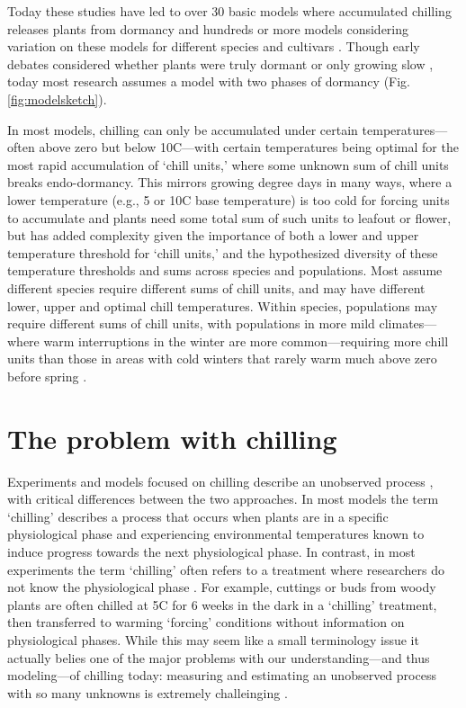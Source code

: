 \documentclass[11pt]{article}
\begin{document}
Today these studies have led to over 30 basic models where accumulated chilling releases plants from dormancy and hundreds or more models considering variation on these models for different species and cultivars \citep[][]{basler2016evaluating,hufkens2018integrated}. Though early debates considered whether plants were truly dormant or only growing slow \citep[`dormancy' or `rest' versus `quiescent;][]{considine2016language}, today most research assumes a model with two phases of dormancy (Fig. \ref{fig:modelsketch}). 

In most models, chilling can only be accumulated under certain temperatures---often above zero but below 10\degree C---with certain temperatures being optimal for the most rapid accumulation of `chill units,' where some unknown sum of chill units breaks endo-dormancy. This mirrors growing degree days in many ways, where a lower temperature (e.g., 5 or 10\degree C base temperature) is too cold for forcing units to accumulate and plants need some total sum of such units to leafout or flower, but has added complexity given the importance of both a lower and upper temperature threshold for `chill units,' and the hypothesized diversity of these temperature thresholds and sums across species and populations. Most assume different species require different sums of chill units, and may have different lower, upper and optimal chill temperatures. Within species, populations may require different sums of chill units, with populations in more mild climates---where warm interruptions in the winter are more common---requiring more chill units than those in areas with cold winters that rarely warm much above zero before spring \citep{campbell1979,leinonen1996dependence}. 

\section*{The problem with chilling} 

Experiments and models focused on chilling describe an unobserved process \citep{chuine2016}, with critical differences between the two approaches. In most models the term `chilling' describes a process that occurs when plants are in a specific physiological phase and experiencing environmental temperatures known to induce progress towards the next physiological phase. In contrast, in most experiments the term `chilling' often refers to a treatment where researchers do not know the physiological phase \citep{flynn2018,ospreebbms}. For example, cuttings or buds from woody plants are often chilled at 5\degree C for 6 weeks in the dark in a `chilling' treatment, then transferred to warming `forcing' conditions without information on physiological phases. While this may seem like a small terminology issue it actually belies one of the major problems with our understanding---and thus modeling---of chilling today: measuring and estimating an unobserved process with so many unknowns is extremely challeinging \citep[][, see also: Box: Why has progress on modeling stalled for decades?]{ospreebbms}. %
\end{document}
